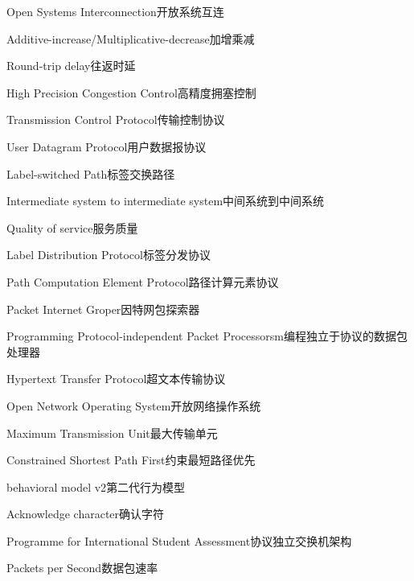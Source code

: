 {Open Systems Interconnection}{开放系统互连}

{Additive-increase/Multiplicative-decrease}{加增乘减}

{Round-trip delay}{往返时延}

{High Precision Congestion Control}{高精度拥塞控制}

{Transmission Control Protocol}{传输控制协议}

{User Datagram Protocol}{用户数据报协议}

{Label-switched Path}{标签交换路径}

{Intermediate system to intermediate system}{中间系统到中间系统}

{Quality of service}{服务质量}

{Label Distribution Protocol}{标签分发协议}

{Path Computation Element Protocol}{路径计算元素协议}

{Packet Internet Groper}{因特网包探索器}

{Programming Protocol-independent Packet Processorsm}{编程独立于协议的数据包处理器}

{Hypertext Transfer Protocol}{超文本传输协议}

{Open Network Operating System}{开放网络操作系统}

{Maximum Transmission Unit}{最大传输单元}

{Constrained Shortest Path First}{约束最短路径优先}

{behavioral model v2}{第二代行为模型}

{Acknowledge character}{确认字符}

{Programme for International Student Assessment}{协议独立交换机架构}

{Packets per Second}{数据包速率}

